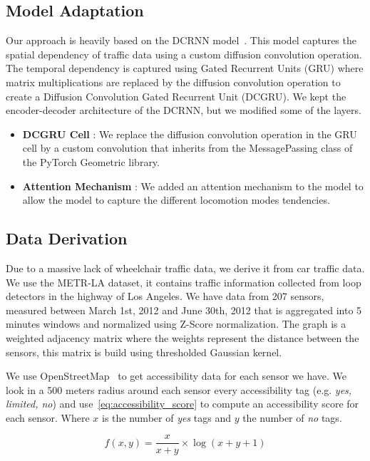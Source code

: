 \subsection{Model Adaptation}\label{subsec:model-adaptation}
Our approach is heavily based on the DCRNN model~\cite{DCRNN}.
This model captures the spatial dependency of traffic data using a custom diffusion convolution operation.
The temporal dependency is captured using Gated Recurrent Units (GRU) where matrix multiplications are replaced by
the diffusion convolution operation to create a Diffusion Convolution Gated Recurrent Unit (DCGRU).
We kept the encoder-decoder architecture of the DCRNN, but we modified some of the layers.

\begin{itemize}
    \item \textbf{DCGRU Cell} : We replace the diffusion convolution operation in the GRU cell by a custom convolution
    that inherits from the MessagePassing class of the PyTorch Geometric library.
    \item \textbf{Attention Mechanism} : We added an attention mechanism to the model to allow the model to capture
    the different locomotion modes tendencies.
\end{itemize}

\subsection{Data Derivation}\label{subsec:data-derivation}
Due to a massive lack of wheelchair traffic data, we derive it from car traffic data.
We use the METR-LA dataset, it contains traffic information collected from loop detectors in the highway of Los Angeles.
We have data from 207 sensors, measured between March 1st, 2012 and June 30th, 2012 that is aggregated into 5 minutes windows and normalized using Z-Score normalization.
The graph is a weighted adjacency matrix where the weights represent the distance between the sensors, this matrix is build using thresholded Gaussian kernel\cite{Shuman_2013}.

We use OpenStreetMap~\cite{OpenStreetMap} to get accessibility data for each sensor we have.
We look in a 500 meters radius around each sensor every accessibility tag (e.g. \textit{yes, limited, no}) and use~\eqref{eq:accessibility_score} to compute an accessibility score for each sensor.
Where $x$ is the number of \textit{yes} tags and $y$ the number of \textit{no} tags.

\begin{equation}
    f(x, y) = \frac{x}{x + y} \times \log(x + y + 1)\label{eq:accessibility_score}
\end{equation}

